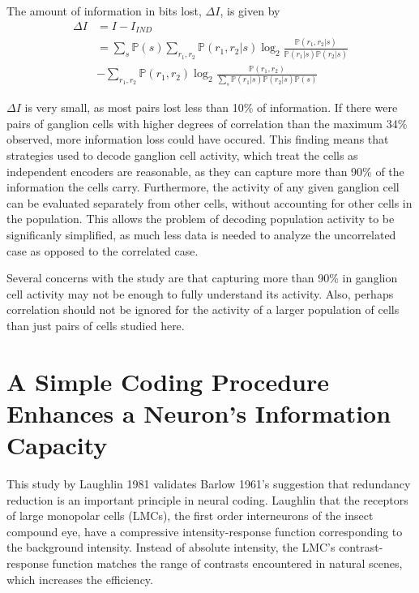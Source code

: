 \documentclass[twoside]{article}
\begin{document}
\begin{multicols}{2}
The amount of information in bits lost, $\Delta I$, is given by 
\begin{align}
	\Delta I 
		&= I - I_{IND} \\
		&= \sum_s\mathbb{P}(s) \sum_{r_1,r_2}\mathbb{P}(r_1,r_2|s) \log_2 \frac{\mathbb{P}(r_1,r_2|s)}{\mathbb{P}(r_1|s)\mathbb{P}(r_2|s)} \\
		&- \sum_{r_1,r_2}\mathbb{P}(r_1,r_2) \log_2 \frac{\mathbb{P}(r_1,r_2)}{\sum_s \mathbb{P}(r_1|s)\mathbb{P}(r_2|s) \mathbb{P}(s)} 
\end{align}

$\Delta I$ is very small, as most pairs lost less than 10\% of information. If there were pairs of ganglion cells with higher degrees of correlation than the maximum 34\% observed, more information loss could have occured. This finding means that strategies used to decode ganglion cell activity, which treat the cells as independent encoders are reasonable, as they can capture more than 90\% of the information the cells carry. Furthermore, the activity of any given ganglion cell can be evaluated separately from other cells, without accounting for other cells in the population. This allows the problem of decoding population activity to be significanly simplified, as much less data is needed to analyze the uncorrelated case as opposed to the correlated case. 

Several concerns with the study are that capturing more than 90\% in ganglion cell activity may not be enough to fully understand its activity. Also, perhaps correlation should not be ignored for the activity of a larger population of cells than just pairs of cells studied here. 







\section{A Simple Coding Procedure Enhances a Neuron's Information Capacity}

This study by Laughlin 1981 validates Barlow 1961's suggestion that redundancy reduction is an important principle in neural coding. Laughlin that the receptors of large monopolar cells (LMCs), the first order interneurons of the insect compound eye, have a compressive intensity-response function corresponding to the background intensity. Instead of absolute intensity, the LMC's contrast-response function matches the range of contrasts encountered in natural scenes, which increases the efficiency.


\end{multicols}
\end{document}
